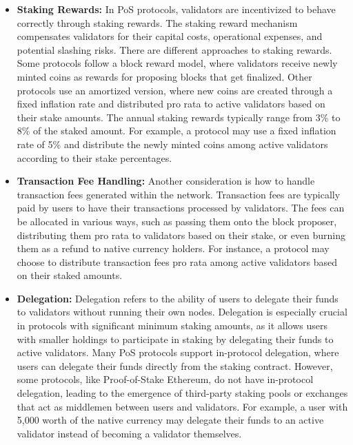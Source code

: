 \begin{itemize}
    \item \textbf{Staking Rewards:} In PoS protocols, validators are incentivized to behave correctly through staking rewards. The staking reward mechanism compensates validators for their capital costs, operational expenses, and potential slashing risks. There are different approaches to staking rewards. Some protocols follow a block reward model, where validators receive newly minted coins as rewards for proposing blocks that get finalized. Other protocols use an amortized version, where new coins are created through a fixed inflation rate and distributed pro rata to active validators based on their stake amounts. The annual staking rewards typically range from 3\% to 8\% of the staked amount. For example, a protocol may use a fixed inflation rate of 5\% and distribute the newly minted coins among active validators according to their stake percentages.
    
    \item \textbf{Transaction Fee Handling:} Another consideration is how to handle transaction fees generated within the network. Transaction fees are typically paid by users to have their transactions processed by validators. The fees can be allocated in various ways, such as passing them onto the block proposer, distributing them pro rata to validators based on their stake, or even burning them as a refund to native currency holders. For instance, a protocol may choose to distribute transaction fees pro rata among active validators based on their staked amounts.
    
    \item \textbf{Delegation:} Delegation refers to the ability of users to delegate their funds to validators without running their own nodes. Delegation is especially crucial in protocols with significant minimum staking amounts, as it allows users with smaller holdings to participate in staking by delegating their funds to active validators. Many PoS protocols support in-protocol delegation, where users can delegate their funds directly from the staking contract. However, some protocols, like Proof-of-Stake Ethereum, do not have in-protocol delegation, leading to the emergence of third-party staking pools or exchanges that act as middlemen between users and validators. For example, a user with 5,000 worth of the native currency may delegate their funds to an active validator instead of becoming a validator themselves.
\end{itemize}

